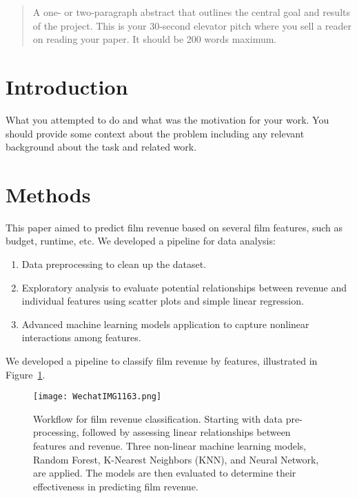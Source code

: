 \documentclass{article}
\begin{document}

\begin{abstract}
A one- or two-paragraph abstract that outlines the central goal and
  results of the project.  This is your 30-second elevator pitch where you
  sell a reader on reading your paper.  It should be 200 words maximum.
\end{abstract}

\section{Introduction}
\label{introduction}

What you attempted to do and what
  was the motivation for your work. You should provide some context about the problem
  including any relevant background about the task and related work.

\section{Methods}
\label{methods}
This paper aimed to predict film revenue based on several film features, such as budget, runtime, etc. We developed a pipeline for data analysis:
\begin{enumerate}
    \item Data preprocessing to clean up the dataset.
    \item Exploratory analysis to evaluate potential relationships between revenue and individual features using scatter plots and simple linear regression.
    \item Advanced machine learning models application to capture nonlinear interactions among features.
\end{enumerate}

We developed a pipeline to classify film revenue by features, illustrated in Figure~\ref{fig:film_revenue_pipeline}.

\begin{figure}[H]
    \centering
    \vspace{0.3cm} %
    \texttt{[image: WechatIMG1163.png]} %
    \caption{Workflow for film revenue classification. Starting with data pre-processing, followed by assessing linear relationships between features and revenue. Three non-linear machine learning models, Random Forest, K-Nearest Neighbors (KNN), and Neural Network, are applied. The models are then evaluated to determine their effectiveness in predicting film revenue.}
    \label{fig:film_revenue_pipeline}
\end{figure}
\end{document}
